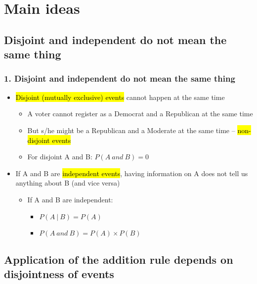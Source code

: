 \documentclass[11pt,containsverbatim,handout,xcolor=xelatex,dvipsnames,table]{beamer}
\begin{document}

\section{Main ideas}


\subsection{Disjoint and independent do not mean the same thing}
\label{mi1}


\begin{frame}
\frametitle{1. Disjoint and independent do not mean the same thing}

\begin{itemize}

\item \hl{Disjoint (mutually exclusive) events} cannot happen at the same time
\begin{itemize}
\item A voter cannot register as a Democrat and a Republican at the same time
\item But s/he might be a Republican and a Moderate at the same time -- 
\hl{non-disjoint events}
\item For disjoint A and B: $P(A~and~B) = 0$
\end{itemize}

\pause

\item If A and B are \hl{independent events}, having information on A does 
not tell us anything about B (and vice versa)
\begin{itemize}
\item If A and B are independent: 
\begin{itemize}
\item $P(A~|~B) = P(A)$
\item $P(A~and~B) = P(A) \times P(B)$
\end{itemize}
\end{itemize}

\end{itemize}
\end{frame}


\subsection{Application of the addition rule depends on disjointness of events}
\label{mi2}
\end{document}
